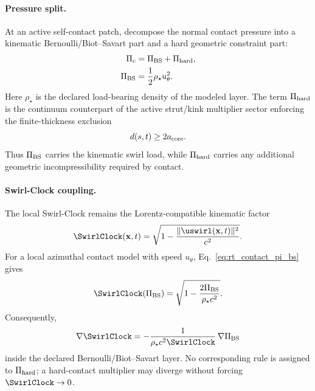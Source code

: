 \paragraph{Pressure split.}
At an active self-contact patch, decompose the normal contact pressure into a
kinematic Bernoulli/Biot--Savart part and a hard geometric constraint part:
\begin{align}
    \Pi_c
    &=
    \Pi_{\rm BS}
    +
    \Pi_{\rm hard},
    \label{eq:rt_contact_pressure_split}
    \\
    \Pi_{\rm BS}
    &=
    \frac12\rho_\star u_\theta^2 .
    \label{eq:rt_contact_pi_bs}
\end{align}
Here \(\rho_\star\) is the declared load-bearing density of the modeled layer.
The term \(\Pi_{\rm hard}\) is the continuum counterpart of the active
strut/kink multiplier sector enforcing the finite-thickness exclusion
\begin{equation}
    d(s,t)\ge 2a_{\rm core}.
    \label{eq:rt_contact_distance_exclusion}
\end{equation}
Thus \(\Pi_{\rm BS}\) carries the kinematic swirl load, while
\(\Pi_{\rm hard}\) carries any additional geometric incompressibility required
by contact.

\paragraph{Swirl-Clock coupling.}
The local Swirl-Clock remains the Lorentz-compatible kinematic factor
\begin{equation}
    \SwirlClock(\mathbf x,t)
    =
    \sqrt{
        1-
        \frac{\lVert\uswirl(\mathbf x,t)\rVert^2}{c^2}
    } .
    \label{eq:rt_contact_swirl_clock_kinematic}
\end{equation}
For a local azimuthal contact model with speed \(u_\theta\),
Eq.~\eqref{eq:rt_contact_pi_bs} gives
\begin{equation}
    \SwirlClock(\Pi_{\rm BS})
    =
    \sqrt{
        1-
        \frac{2\Pi_{\rm BS}}{\rho_\star c^2}
    } .
    \label{eq:rt_contact_swirl_clock_pressure}
\end{equation}
Consequently,
\begin{equation}
    \nabla\SwirlClock
    =
    -\frac{1}{\rho_\star c^2\SwirlClock}\,
    \nabla\Pi_{\rm BS}
    \label{eq:rt_contact_swirl_clock_gradient_pressure}
\end{equation}
inside the declared Bernoulli/Biot--Savart layer.  No corresponding rule is
assigned to \(\Pi_{\rm hard}\); a hard-contact multiplier may diverge without
forcing \(\SwirlClock\to0\).

